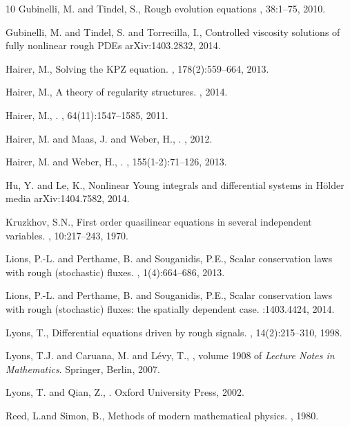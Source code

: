 \documentclass[11pt,a4paper]{amsart}
\numberwithin{equation}{section} %
\begin{document}
\begin{thebibliography}{10}
Gubinelli, M. and Tindel, S.,
\newblock Rough evolution equations
,  38:1--75, 2010.

Gubinelli, M. and Tindel, S. and Torrecilla, I.,
\newblock Controlled viscosity solutions of fully nonlinear rough {PDE}s
\newblock arXiv:1403.2832, 2014.

Hairer, M.,
\newblock Solving the KPZ equation.
, 178(2):559--664, 2013.

Hairer, M.,
\newblock A theory of regularity structures.
, 2014.


 Hairer, M.,
.
, 64(11):1547--1585, 2011.

 Hairer, M. and   Maas, J. and  Weber, H.,
.
, 2012.

 Hairer, M. and  Weber, H.,
.
, 155(1-2):71--126, 2013.

 Hu, Y. and Le, K.,
 \newblock Nonlinear Young integrals and differential systems in H\"older media
 \newblock arXiv:1404.7582, 2014.
 
Kruzkhov, S.N.,
\newblock First order quasilinear equations in several independent variables.
, 10:217--243, 1970.

Lions, P.-L. and Perthame, B. and Souganidis, P.E.,
\newblock Scalar conservation laws with rough (stochastic) fluxes.
, 1(4):664--686, 2013.

Lions, P.-L. and Perthame, B. and Souganidis, P.E.,
\newblock Scalar conservation laws with rough (stochastic) fluxes: the spatially dependent case.
:1403.4424, 2014.

Lyons, T.,  
\newblock Differential equations driven by rough signals.
, 14(2):215--310, 1998. 

Lyons, T.J. and Caruana, M. and  L{\'e}vy, T.,
, volume 1908 of
  {\em {Lecture Notes in Mathematics}}.
\newblock Springer, Berlin, 2007.

Lyons, T. and  Qian, Z.,
.
\newblock Oxford University Press, 2002.

Reed, L.and Simon, B.,
\newblock Methods of modern mathematical physics.
, 1980.

\end{thebibliography}
\end{document}
